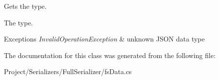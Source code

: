 Gets the type. 

The type.


\begin{DoxyExceptions}{Exceptions}
{\em Invalid\+Operation\+Exception} & unknown J\+S\+ON data type\\
\hline
\end{DoxyExceptions}


The documentation for this class was generated from the following file\+:\begin{DoxyCompactItemize}
\item 
Project/\+Serializers/\+Full\+Serializer/fs\+Data.\+cs\end{DoxyCompactItemize}
